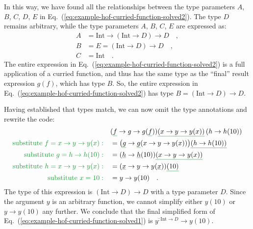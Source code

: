 In this way, we have found all the relationships between the type
parameters $A$, $B$, $C$, $D$, $E$ in Eq.~(\ref{eq:example-hof-curried-function-solved2}).
The type $D$ remains arbitrary, while the type parameters $A$, $B$,
$C$, $E$ are expressed as:
\begin{align}
A & =\text{Int}\rightarrow\left(\text{Int}\rightarrow D\right)\rightarrow D\quad,\label{eq:example-hof-curried-solved3}\\
B & =E=\left(\text{Int}\rightarrow D\right)\rightarrow D\quad,\label{eq:example-hof-curried-solved4}\\
C & =\text{Int}\quad.\nonumber 
\end{align}
The entire expression in Eq.~(\ref{eq:example-hof-curried-function-solved2})
is a full application of a curried function, and thus has the same
type as the \textsf{``}final\textsf{''} result expression $g(f)$, which has type
$B$. So, the entire expression in Eq.~(\ref{eq:example-hof-curried-function-solved2})
has type $B=\left(\text{Int}\rightarrow D\right)\rightarrow D$.

Having established that types match, we can now omit the type annotations
and rewrite the code:
\begin{align*}
 & (\gunderline f\rightarrow g\rightarrow g(\gunderline f))\gunderline{\left(x\rightarrow y\rightarrow y(x)\right)}\left(h\rightarrow h(10)\right)\\
{\color{greenunder}\text{substitute }f=x\rightarrow y\rightarrow y(x):}\quad & =\big(\gunderline g\rightarrow\gunderline g(x\rightarrow y\rightarrow y(x))\big)\gunderline{\left(h\rightarrow h(10)\right)}\\
{\color{greenunder}\text{substitute }g=h\rightarrow h(10):}\quad & =(\gunderline h\rightarrow\gunderline h(10))\gunderline{\left(x\rightarrow y\rightarrow y(x)\right)}\\
{\color{greenunder}\text{substitute }h=x\rightarrow y\rightarrow y(x):}\quad & =(\gunderline x\rightarrow y\rightarrow y(\gunderline x))\gunderline{(10)}\\
{\color{greenunder}\text{substitute }x=10:}\quad & =y\rightarrow y(10)\quad.
\end{align*}
The type of this expression is $\left(\text{Int}\rightarrow D\right)\rightarrow D$
with a type parameter $D$. Since the argument $y$ is an arbitrary
function, we cannot simplify either $y(10)$ or $y\rightarrow y(10)$
any further. We conclude that the final simplified form of Eq.~(\ref{eq:example-hof-curried-function-solved1})
is $y^{:\text{Int}\rightarrow D}\rightarrow y(10)$.

